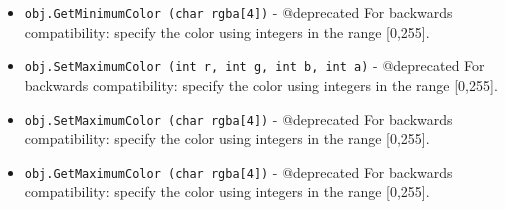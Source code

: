 \begin{itemize}
\item  \verb|obj.GetMinimumColor (char rgba[4])| -  @deprecated For backwards compatibility: specify the color using 
 integers in the range [0,255].  

\item  \verb|obj.SetMaximumColor (int r, int g, int b, int a)| -  @deprecated For backwards compatibility: specify the color using 
 integers in the range [0,255].  

\item  \verb|obj.SetMaximumColor (char rgba[4])| -  @deprecated For backwards compatibility: specify the color using 
 integers in the range [0,255].  

\item  \verb|obj.GetMaximumColor (char rgba[4])| -  @deprecated For backwards compatibility: specify the color using 
 integers in the range [0,255].  

\end{itemize}
